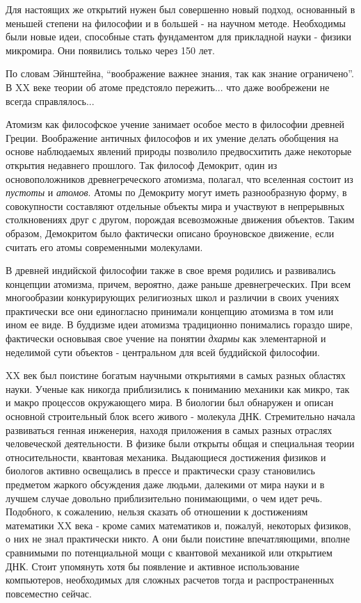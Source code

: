 Для настоящих же открытий нужен был совершенно новый подход, основанный в меньшей степени на философии и в большей - на научном методе. 
Необходимы были новые идеи, способные стать фундаментом для прикладной науки - физики микромира. 
Они появились только через 150 лет.

По словам Эйнштейна, ``воображение важнее знания, так как знание ограничено''.
В XX веке теории об атоме предстояло пережить... что даже вообрежени не всегда справлялось...





Атомизм как философское учение занимает особое место в философии древней Греции.
Воображение античных философов и их умение делать обобщения на основе наблюдаемых явлений природы позволило предвосхитить даже некоторые открытия недавнего прошлого.
Так философ Демокрит, один из основоположников древнегреческого атомизма, полагал, что вселенная состоит из \textit{пустоты} и \textit{атомов}. Атомы по Демокриту могут иметь разнообразную форму, в совокупности составляют отдельные объекты мира и участвуют в непрерывных столкновениях друг с другом, порождая всевозможные движения объектов.
Таким образом, Демокритом было фактически описано броуновское движение, если считать его атомы современными молекулами.

В древней индийской философии также в свое время родились и развивались концепции атомизма, причем, вероятно, даже раньше древнегреческих.
При всем многообразии конкурирующих религиозных школ и различии в своих учениях практически все они единогласно принимали концепцию атомизма в том или ином ее виде.
В буддизме идеи атомизма традиционно понимались гораздо шире, фактически основывая свое учение на понятии \textit{дхармы} как элементарной и неделимой сути объектов - центральном для всей буддийской философии.




XX век был поистине богатым научными открытиями в самых разных областях науки. Ученые как никогда приблизились к пониманию механики как микро, так и макро процессов окружающего мира. В биологии был обнаружен и описан основной строительный блок всего живого - молекула ДНК. Стремительно начала развиваться генная инженерия, находя приложения в самых разных отраслях человеческой деятельности. В физике были открыты общая и специальная теории относительности, квантовая механика. Выдающиеся достижения физиков и биологов активно освещались в прессе и практически сразу становились предметом жаркого обсуждения даже людьми, далекими от мира науки и в лучшем случае довольно приблизительно понимающими, о чем идет речь. 
Подобного, к сожалению, нельзя сказать об отношении к достижениям математики XX века - кроме самих математиков и, пожалуй, некоторых физиков, о них не знал практически никто. А они были поистине впечатляющими, вполне сравнимыми по потенциальной мощи с квантовой механикой или открытием ДНК. Стоит упомянуть хотя бы появление и активное использование компьютеров, необходимых для сложных расчетов тогда и распространенных повсеместно сейчас.

